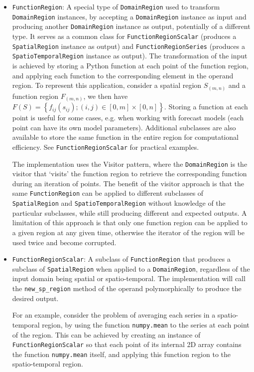 \begin{itemize}
	\item \texttt{FunctionRegion}: A special type of \texttt{DomainRegion} used to transform \texttt{DomainRegion} instances, by accepting a \texttt{DomainRegion} instance as input and producing another \texttt{DomainRegion} instance as output, potentially of a different type. It serves as a common class for \texttt{FunctionRegionScalar} (produces a \texttt{SpatialRegion} instance as output) and \texttt{FunctionRegionSeries} (produces a \texttt{SpatioTemporalRegion} instance as output). The transformation of the input is achieved by storing a Python function at each point of the function region, and applying each function to the corresponding element in the operand region. To represent this application, consider a spatial region $S_{(m,n)}$ and a function region $F_{(m,n)}$, we then have $F(S) = \left\{ f_{ij}(s_{ij}); (i, j) \in [0, m]\times[0, n] \right\}$. Storing a function at each point is useful for some cases, e.g. when working with forecast models (each point can have its own model parameters). Additional subclasses are also available to store the same function in the entire region for computational efficiency. See \texttt{FunctionRegionScalar} for practical examples.
	
	The implementation uses the Visitor pattern, where the \texttt{DomainRegion} is the visitor that `visits' the function region to retrieve the corresponding function during an iteration of points. The benefit of the visitor approach is that the same \texttt{FunctionRegion} can be applied to different subclasses of \texttt{SpatialRegion} and \texttt{SpatioTemporalRegion} without knowledge of the particular subclasses, while still producing different and expected outputs. A limitation of this approach is that only one function region can be applied to a given region at any given time, otherwise the iterator of the region will be used twice and become corrupted.
	
	\item \texttt{FunctionRegionScalar}: A subclass of \texttt{FunctionRegion} that produces a subclass of \texttt{SpatialRegion} when applied to a \texttt{DomainRegion}, regardless of the input domain being spatial or spatio-temporal. The implementation will call the \texttt{new\_sp\_region} method of the operand polymorphically to produce the desired output.
	
	For an example, consider the problem of averaging each series in a spatio-temporal region, by using the function \texttt{numpy.mean} to the series at each point of the region. This can be achieved by creating an instance of \texttt{FunctionRegionScalar} so that each point of its internal 2D array contains the function \texttt{numpy.mean} itself, and applying this function region to the spatio-temporal region. 
	

\end{itemize}
